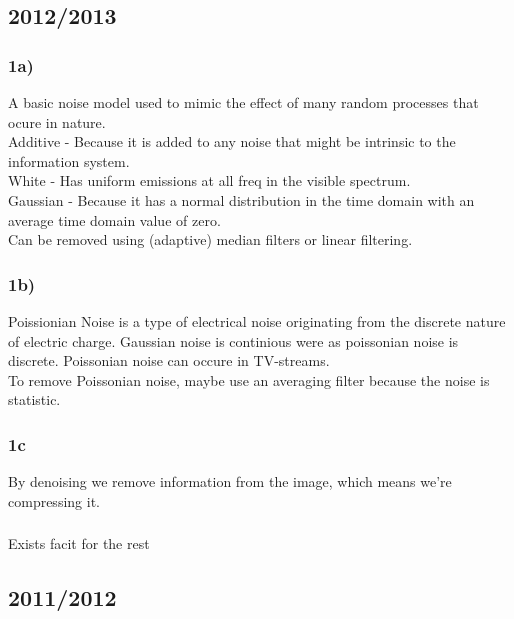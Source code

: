 \documentclass[12pt]{article}
\begin{document}
\subsection{2012/2013}

    \subsubsection*{1a)}
    
        A basic noise model used to mimic the effect of many random processes that ocure in nature. \\
        Additive - Because it is added to any noise that might be intrinsic to the information system.\\
        White - Has uniform emissions at all freq in the visible spectrum.\\
        Gaussian - Because it has a normal distribution in the time domain with an average time domain value of zero.\\
        Can be removed using (adaptive) median filters or linear filtering.
        
    \subsubsection*{1b)}
    
        Poissionian Noise is a type of electrical noise originating from the discrete nature of electric charge. 
        Gaussian noise is continious were as poissonian noise is discrete. Poissonian noise can occure in TV-streams. \\
        To remove Poissonian noise, maybe use an averaging filter because the noise is statistic.
        
    \subsubsection*{1c}
    
        By denoising we remove information from the image, which means we're compressing it.
        
    \subsubsection*{}
        
        Exists facit for the rest
        
\subsection{2011/2012}
\end{document}
